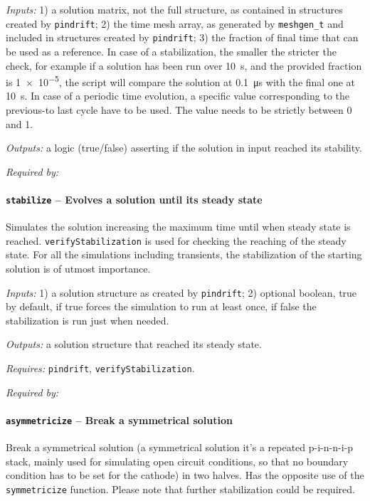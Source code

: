 \textit{Inputs:} 1) a solution matrix, not the full structure, as contained in
     structures created by \texttt{pindrift};
   2) the time mesh array, as generated by \texttt{meshgen\_t} and included
     in structures created by \texttt{pindrift};
   3) the fraction of final time that can be used as a
     reference. In case of a stabilization, the smaller the stricter the
     check, for example if a solution has been run over \SI{10}{\s}, and the provided fraction is \num{1e-5}, the script will compare the solution at \SI{0.1}{\us} with the final one at \SI{10}{\s}. In case of a periodic time evolution, a specific value
     corresponding to the previous-to last cycle have to be used. The
     value needs to be strictly between 0 and 1.

\textit{Outputs:} a logic (true/false) asserting if the solution in input reached its stability.


\textit{Required by:} 

		\paragraph{\texttt{stabilize} -- Evolves a solution until its steady state}
Simulates the solution increasing the maximum time until when steady state is reached. 
\texttt{verify\-Stabilization} is used for checking the reaching of the steady state.
For all the simulations including transients, the stabilization of the starting solution is of utmost importance.

\textit{Inputs:} 1) a solution structure as created by \texttt{pindrift};
   2) optional boolean, true by default, 
     if true forces the simulation to run at least once, if false the
     stabilization is run just when needed.
     
\textit{Outputs:} a solution structure that reached its steady state.

\textit{Requires:} \texttt{pindrift}, \texttt{verify\-Stabilization}.

\textit{Required by:} 

		\paragraph{\texttt{asymmetricize} -- Break a symmetrical solution}\label{asymmetricize}
		Break a symmetrical solution (a symmetrical solution it's a repeated p-i-n-n-i-p stack, mainly used for simulating open circuit conditions, so that no boundary condition has to be set for the cathode) in two halves. Has the opposite use of the \texttt{symmetricize} function.
		Please note that further stabilization could be required.
		
